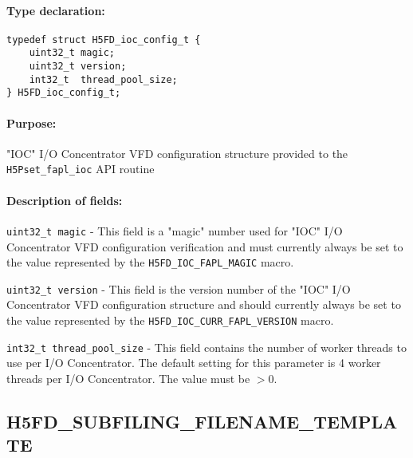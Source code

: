 \documentclass[../main.tex]{subfiles}
\begin{document}
\paragraph{Type declaration:}
\begin{flushleft}%
\begin{verbatim}
typedef struct H5FD_ioc_config_t {
    uint32_t magic;
    uint32_t version;
    int32_t  thread_pool_size;
} H5FD_ioc_config_t;
\end{verbatim}
\end{flushleft}%

\paragraph{Purpose:}
\begin{flushleft}%
"IOC" I/O Concentrator VFD configuration structure provided to the \texttt{H5Pset\_fapl\_ioc}
API routine
\end{flushleft}%

\paragraph{Description of fields:}
\begin{flushleft}%
\texttt{uint32\_t magic} - This field is a "magic" number used for "IOC" I/O Concentrator VFD
configuration verification and must currently always be set to the value represented by the
\texttt{H5FD\_IOC\_FAPL\_MAGIC} macro.

\texttt{uint32\_t version} - This field is the version number of the "IOC" I/O Concentrator VFD
configuration structure and should currently always be set to the value represented by the
\texttt{H5FD\_IOC\_CURR\_FAPL\_VERSION} macro.

\texttt{int32\_t thread\_pool\_size} - This field contains the number of worker threads to
use per I/O Concentrator. The default setting for this parameter is 4 worker threads per I/O
Concentrator. The value must be $> 0$.
\end{flushleft}%

\newpage

\subsection{H5FD\_SUBFILING\_FILENAME\_TEMPLATE}
\label{ref:h5fd_subfiling_filename_template}
\end{document}

